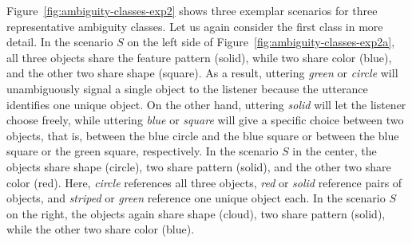 \documentclass[11pt,a4paper]{article}
\begin{document}
Figure~\ref{fig:ambiguity-classes-exp2} shows three exemplar scenarios for three representative  ambiguity classes. 
Let us again consider the first class in more detail.
In the scenario $S$ on the left side of Figure~\ref{fig:ambiguity-classes-exp2a}, 
all three objects share the feature pattern (solid), while two share  color (blue), and the other two share shape (square).
As a result, uttering \textit{green} or \textit{circle} will unambiguously signal a single object to the listener because the utterance identifies one unique object. 
On the other hand, uttering \textit{solid} will let the listener choose freely, while uttering \textit{blue} or \textit{square} will give a specific choice between two objects, that is, between the blue circle and the blue square or between the blue square or the green square, respectively.
In the scenario $S$ in the center, the objects share shape (circle), two share pattern (solid), and the other two share color (red).
Here, \textit{circle} references all three objects, \textit{red} or \textit{solid} reference pairs of objects, and \textit{striped} or \textit{green} reference one unique object each.
In the scenario $S$ on the right, the objects again share shape (cloud), two share  pattern (solid), while the other two share color (blue).
\end{document}
